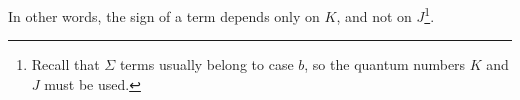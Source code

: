 In other words, the sign of a term depends only on $K$, and not on $J$\footnote{Recall that $\Sigma$ terms usually belong to case $b$, so the quantum numbers $K$ and $J$ must be used.}.
